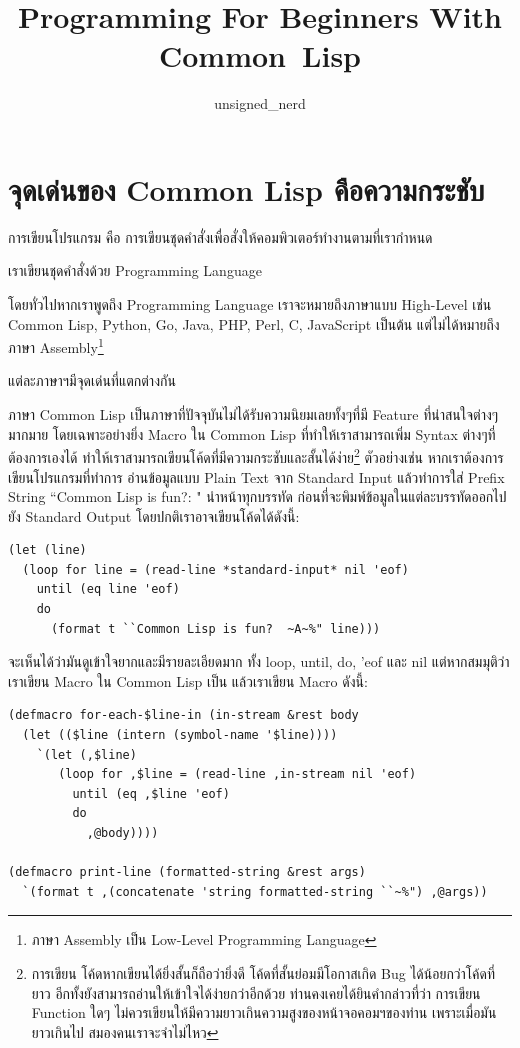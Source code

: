 \documentclass[a4paper]{article}
\begin{document}
\title{Programming For Beginners With Common~Lisp}
\author{unsigned\_nerd}
\maketitle

\tableofcontents

\section{จุดเด่นของ Common Lisp คือความกระชับ}

การเขียนโปรแกรม คือ การเขียนชุดคำสั่งเพื่อสั่งให้คอมพิวเตอร์ทำงานตามที่เรากำหนด

เราเขียนชุดคำสั่งด้วย Programming Language

โดยทั่วไปหากเราพูดถึง Programming Language เราจะหมายถึงภาษาแบบ High-Level เช่น
Common Lisp, Python, Go, Java, PHP, Perl, C, JavaScript เป็นต้น
แต่ไม่ได้หมายถึงภาษา Assembly\footnote{ภาษา Assembly เป็น Low-Level
Programming Language}

แต่ละภาษาฯมีจุดเด่นที่แตกต่างกัน

ภาษา Common Lisp เป็นภาษาที่ปัจจุบันไม่ได้รับความนิยมเลยทั้งๆที่มี Feature ที่น่าสนใจต่างๆ%
มากมาย โดยเฉพาะอย่างยิ่ง Macro ใน Common Lisp ที่ทำให้เราสามารถเพิ่ม Syntax ต่างๆที่%
ต้องการเองได้ ทำให้เราสามารถเขียนโค้ดที่มีความกระชับและสั้นได้ง่าย\footnote{การเขียน%
โค้ดหากเขียนได้ยิ่งสั้นก็ถือว่ายิ่งดี โค้ดที่สั้นย่อมมีโอกาสเกิด Bug ได้น้อยกว่าโค้ดที่ยาว
อีกทั้งยังสามารถอ่านให้เข้าใจได้ง่ายกว่าอีกด้วย ท่านคงเคยได้ยินคำกล่าวที่ว่า การเขียน
Function ใดๆ ไม่ควรเขียนให้มีความยาวเกินความสูงของหน้าจอคอมฯของท่าน เพราะเมื่อมัน%
ยาวเกินไป สมองคนเราจะจำไม่ไหว} ตัวอย่างเช่น หากเราต้องการเขียนโปรแกรมที่ทำการ%
อ่านข้อมูลแบบ Plain Text จาก Standard Input
แล้วทำการใส่ Prefix String ``Common Lisp is fun?: " นำหน้าทุกบรรทัด
ก่อนที่จะพิมพ์ข้อมูลในแต่ละบรรทัดออกไปยัง Standard Output โดยปกติเราอาจเขียนโค้ดได้ดังนี้:

\begin{lstlisting}[caption=โค้ดแบบปกติ\label{lst:regular-print-each-line-code}]
(let (line)
  (loop for line = (read-line *standard-input* nil 'eof)
    until (eq line 'eof)
    do
      (format t ``Common Lisp is fun?  ~A~%" line)))
\end{lstlisting}

จะเห็นได้ว่ามันดูเข้าใจยากและมีรายละเอียดมาก ทั้ง loop, until, do, 'eof และ
nil แต่หากสมมุติว่าเราเขียน Macro ใน Common Lisp เป็น แล้วเราเขียน Macro ดังนี้:

\begin{lstlisting}[caption=Macro for-each-\$line-in \&
print-line\label{lst:macro-for-each-line-in-and-print-line}]
(defmacro for-each-$line-in (in-stream &rest body
  (let (($line (intern (symbol-name '$line))))
    `(let (,$line)
       (loop for ,$line = (read-line ,in-stream nil 'eof)
         until (eq ,$line 'eof)
         do
           ,@body))))

(defmacro print-line (formatted-string &rest args)
  `(format t ,(concatenate 'string formatted-string ``~%") ,@args))
\end{lstlisting}
\end{document}
